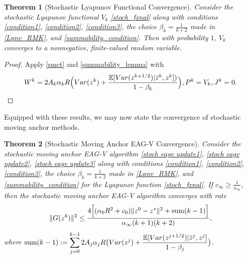 \documentclass[11pt,reqno,oneside]{amsart}
\newtheorem{theorem}{Theorem}[section]
\theoremstyle{definition}
\numberwithin{equation}{section}
\begin{document}
\begin{theorem}[Stochastic Lyapunov Functional Convergence]
    Consider the stochastic Lyapunov functional $V_{k}$ \eqref{stoch_fxnal} along with conditions \eqref{condition1}, \eqref{condition2}, \eqref{condition3}, the choice $\beta_{k} = \frac{1}{k+2}$ made in \cref{Lpnv_RMK}, and \cref{summability_condition}.
    Then with probability $1$, $V_{k}$ converges to a nonnegative, finite-valued random variable.  %
\end{theorem}
\begin{proof}
    Apply \cref{smct} and \cref{summability_lemma} with \[W^{k} = 2A_{k}\alpha_{k}R\Big{(} Var(z^{k}) + \frac{\mathbb{E}[Var(z^{k+1/2})|\bar{z}^{k},z^{k}])}{1 - \beta_{k}} \Big{)}, P^{k} = V_{k}, J^{k} = 0.\]
\end{proof}

Equipped with these results, we may now state the convergence of stochastic moving anchor methods.

\begin{theorem}[Stochastic Moving Anchor EAG-V Convergence]
    Consider the stochastic moving anchor EAG-V algorithm \eqref{stoch eagv update1}, \eqref{stoch eagv update2}, \eqref{stoch eagv update3} along with conditions \eqref{condition1}, \eqref{condition2}, \eqref{condition3}, the choice $\beta_{k} = \frac{1}{k+2}$ made in \cref{Lpnv_RMK}, and \cref{summability_condition} for the Lyapunov function \eqref{stoch_fxnal}.
    If $c_{\infty} \geq \frac{1}{\alpha_{\infty}}$, then the stochastic moving anchor EAG-V algorithm converges with rate 
    \[
        \|G(z^{k})\|^{2} \leq \frac{4\Big{[} (\alpha_{0}R^{2} + c_{0})\|z^{0} - z^{*}\|^{2} + \text{sum}(k-1) \Big{]}}{\alpha_{\infty}(k+1)(k+2)},
    \]
    where $\displaystyle \text{sum}(k-1) := \sum_{j=0}^{k-1} 2A_{j}\alpha_{j}R\big{(}Var(z^{j}) + \frac{\mathbb{E}[Var(z^{j+1/2})|\bar{z}^{j},z^{j}]}{1-\beta_{j}}\big{)}$.
\end{theorem}
\end{document}
